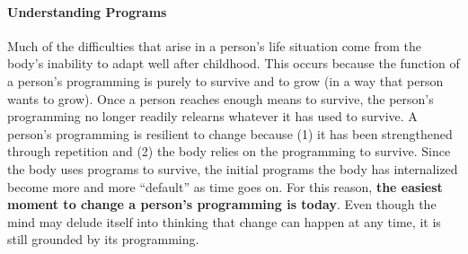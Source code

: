 \documentclass[a4paper, 12pt]{article}
\begin{document}
\paragraph{Understanding Programs}
Much of the difficulties that arise in a person's life situation come from the body's inability to adapt well after childhood. This occurs because the function of a person's programming is purely to survive and to grow (in a way that person wants to grow). Once a person reaches enough means to survive, the person's programming no longer readily relearns whatever it has used to survive. A person's programming is resilient to change because (1) it has been strengthened through repetition and (2) the body relies on the programming to survive. Since the body uses programs to survive, the initial programs the body has internalized become more and more ``default'' as time goes on. For this reason, \textbf{the easiest moment to change a person's programming is today}. Even though the mind may delude itself into thinking that change can happen at any time, it is still grounded by its programming. \\
\end{document}
